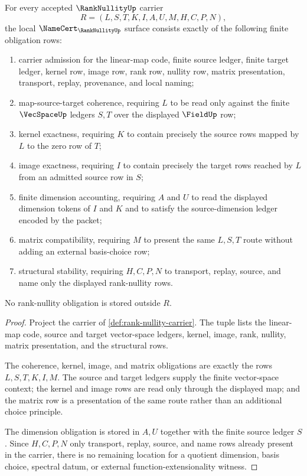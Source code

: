 \begin{theorem}
\label{thm:rank-nullity-namecert-obligations}
For every accepted $\RankNullityUp$ carrier
$$
R=(L,S,T,K,I,A,U,M,H,C,P,N),
$$
the local $\NameCert_{\RankNullityUp}$ surface consists exactly of the following finite obligation rows:
\begin{enumerate}
\item carrier admission for the linear-map code, finite source ledger, finite target ledger, kernel row, image row, rank row, nullity row, matrix presentation, transport, replay, provenance, and local naming;
\item map-source-target coherence, requiring $L$ to be read only against the finite $\VecSpaceUp$ ledgers $S,T$ over the displayed $\FieldUp$ row;
\item kernel exactness, requiring $K$ to contain precisely the source rows mapped by $L$ to the zero row of $T$;
\item image exactness, requiring $I$ to contain precisely the target rows reached by $L$ from an admitted source row in $S$;
\item finite dimension accounting, requiring $A$ and $U$ to read the displayed dimension tokens of $I$ and $K$ and to satisfy the source-dimension ledger encoded by the packet;
\item matrix compatibility, requiring $M$ to present the same $L,S,T$ route without adding an external basis-choice row;
\item structural stability, requiring $H,C,P,N$ to transport, replay, source, and name only the displayed rank-nullity rows.
\end{enumerate}
No rank-nullity obligation is stored outside $R$.
\end{theorem}
\begin{proof}
Project the carrier of \autoref{def:rank-nullity-carrier}. The tuple lists the linear-map code, source and target vector-space ledgers, kernel, image, rank, nullity, matrix presentation, and the structural rows.

The coherence, kernel, image, and matrix obligations are exactly the rows $L,S,T,K,I,M$. The source and target ledgers supply the finite vector-space context; the kernel and image rows are read only through the displayed map; and the matrix row is a presentation of the same route rather than an additional choice principle.

The dimension obligation is stored in $A,U$ together with the finite source ledger $S$. Since $H,C,P,N$ only transport, replay, source, and name rows already present in the carrier, there is no remaining location for a quotient dimension, basis choice, spectral datum, or external function-extensionality witness.
\end{proof}

